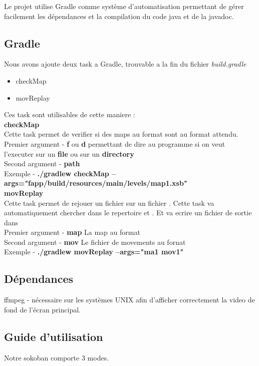 \documentclass[../main.tex]{subfiles}
\begin{document}
Le projet utilise Gradle comme système d'automatisation permettant de gérer facilement les dépendances et la compilation du code java et de la javadoc.
\subsection{Gradle}
Nous avons ajoute deux task a Gradle, trouvable a la fin du fichier \textit{build.gradle}
\begin{itemize}
    \item checkMap
    \item movReplay
\end{itemize}
Ces task sont utilisables de cette maniere : \\

\textbf{checkMap} \\
Cette task permet de verifier si des maps au format  sont au format attendu. \\
Premier argument - \textbf{f} ou \textbf{d} permettant de dire au programme si on veut l'executer sur un \textbf{file} ou sur un \textbf{directory} \\
Second argument - \textbf{path} \\
Exemple - \textbf{./gradlew checkMap --args="fapp/build/resources/main/levels/map1.xsb"} \\

\textbf{movReplay} \\
Cette task permet de rejouer un fichier  sur un fichier . Cette task va automatiquement chercher dans le repertoire 
et . Et va ecrire un fichier de sortie dans  \\
Premier argument - \textbf{map} La map au format  \\
Second argument - \textbf{mov} Le fichier de movements au fornat  \\
Exemple - \textbf{./gradlew movReplay --args="ma1 mov1"}

\subsection{Dépendances}
ffmpeg - nécessaire sur les systèmes UNIX afin d'afficher correctement la video de fond de l'écran principal.
\subsection{Guide d'utilisation}
Notre sokoban comporte 3 modes. \\
\end{document}
